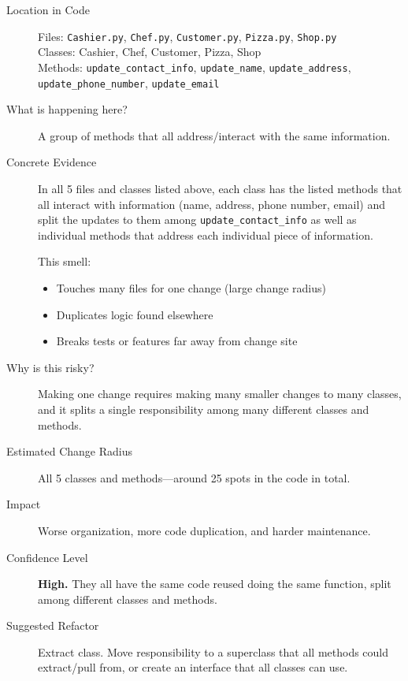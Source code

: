 \documentclass[12pt]{article}
\begin{document}
\begin{description}
    \item[Location in Code]
        Files: \texttt{Cashier.py}, \texttt{Chef.py}, \texttt{Customer.py}, \texttt{Pizza.py}, \texttt{Shop.py} \\
        Classes: Cashier, Chef, Customer, Pizza, Shop \\
        Methods: \texttt{update\_contact\_info}, \texttt{update\_name}, \texttt{update\_address}, \\
        \texttt{update\_phone\_number}, \texttt{update\_email}

    \item[What is happening here?]
        A group of methods that all address/interact with the same information.

    \item[Concrete Evidence]
        In all 5 files and classes listed above, each class has the listed methods that all
        interact with information (name, address, phone number, email) and split the updates
        to them among \texttt{update\_contact\_info} as well as individual methods that address each
        individual piece of information. 

        This smell:
        \begin{itemize}
            \item Touches many files for one change (large change radius)
            \item Duplicates logic found elsewhere
            \item Breaks tests or features far away from change site
        \end{itemize}

    \item[Why is this risky?]
        Making one change requires making many smaller changes to many classes, and it
        splits a single responsibility among many different classes and methods.

    \item[Estimated Change Radius]
        All 5 classes and methods---around 25 spots in the code in total.

    \item[Impact]
        Worse organization, more code duplication, and harder maintenance.

    \item[Confidence Level]
        \textbf{High.} They all have the same code reused doing the same function, split among
        different classes and methods.

    \item[Suggested Refactor]
        {Extract class}. Move responsibility to a superclass that all methods could extract/pull
        from, or create an interface that all classes can use.
\end{description}
\end{document}
